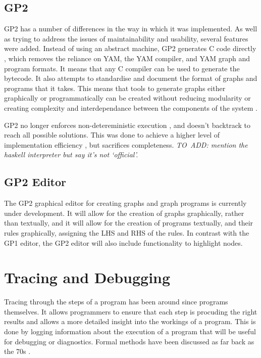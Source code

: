 \documentclass{UoYCSproject}
\begin{document}
\subsection{GP2}
GP2 has a number of differences in the way in which it was implemented. As well as trying to address the issues of maintainability and usability, several features were added.
Instead of using an abstract machine, GP2 generates C code directly \cite{chris_compiler}, which removes the reliance on YAM, the YAM compiler, and YAM graph and program formats. It means that any C compiler can be used to generate the bytecode. It also attempts to standardise and document the format of graphs and programs that it takes. This means that tools to generate graphs either graphically or programmatically can be created without reducing modularity or creating complexity and interdependance between the components of the system \cite{gp2_ide}.

GP2 no longer enforces non-detereministic execution \cite[p. 15]{gp2_ide}, and doesn't backtrack to reach all possible solutions. This was done to achieve a higher level of implementation efficiency \cite[p. 15]{chris_compiler}, but sacrifices completeness.
\emph{TO~ADD: mention the haskell interpreter but say it's not `official'.} %

\subsection{GP2 Editor}
The GP2 graphical editor for creating graphs and graph programs is currently under development. It will allow for the creation of graphs graphically, rather than textually, and it will allow for the creation of programs textually, and their rules graphically, assigning the LHS and RHS of the rules. In contrast with the GP1 editor, the GP2 editor will also include functionality to highlight nodes.

\section{Tracing and Debugging}
Tracing through the steps of a program has been around since programs themselves. %
It allows programmers to ensure that each step is procuding the right results and allows a more detailed insight into the workings of a program. This is done by logging information about the execution of a program that will be useful for debugging or diagnostics. 
Formal methods have been discussed as far back as the 70s \cite{psych_debug, code_walkthroughs}. 
\end{document}
